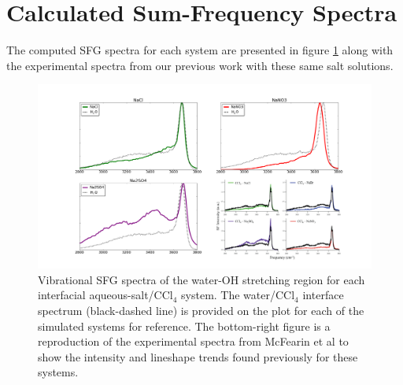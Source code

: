 \section{Calculated Sum-Frequency Spectra}

The computed SFG spectra for each system are presented in figure \ref{fig:sfg-spectra} along with the experimental spectra from our previous work with these same salt solutions.\cite{McFearin2009}

\begin{figure}[h!]
\begin{center}
	\includegraphics[scale=0.3]{images/sfg-spectra.png}
	\caption{Vibrational SFG spectra of the water-OH stretching region for each interfacial aqueous-salt/CCl$_4$ system. The water/CCl$_4$ interface spectrum (black-dashed line) is provided on the plot for each of the simulated systems for reference. The bottom-right figure is a reproduction of the experimental spectra from McFearin et al to show the intensity and lineshape trends found previously for these systems.\cite{McFearin2009}}
	\label{fig:sfg-spectra}
\end{center}
\end{figure}


